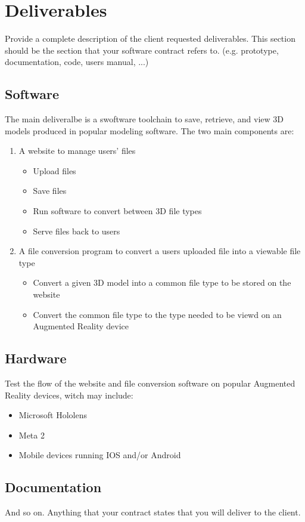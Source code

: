 \section{Deliverables}

Provide a complete description of the client requested deliverables.   This section should be the section that your software contract refers to.
(e.g. prototype, documentation, code, users manual, ...)


\subsection{Software}
The main deliveralbe is a swoftware toolchain to save, retrieve, and view 3D models produced in popular modeling software.  The two main components are:

\begin{enumerate}
	\item A website to manage users' files
		\begin{itemize}
			\item Upload files
			\item Save files
			\item Run software to convert between 3D file types
			\item Serve files back to users
		\end{itemize}
	\item A file conversion program to convert a users uploaded file into a viewable file type
		\begin{itemize}
			\item Convert a given 3D model into a common file type to be stored on the website
			\item Convert the common file type to the type needed to be viewd on an Augmented Reality device
		\end{itemize}
\end{enumerate}

\subsection{Hardware}

Test the flow of the website and file conversion software on popular Augmented Reality devices, witch may include:
\begin{itemize}
	\item Microsoft Hololens
	\item Meta 2
	\item Mobile devices running IOS and/or Android
\end{itemize}

\subsection{Documentation}
And so on.  Anything that your contract states that you will deliver to the client.

